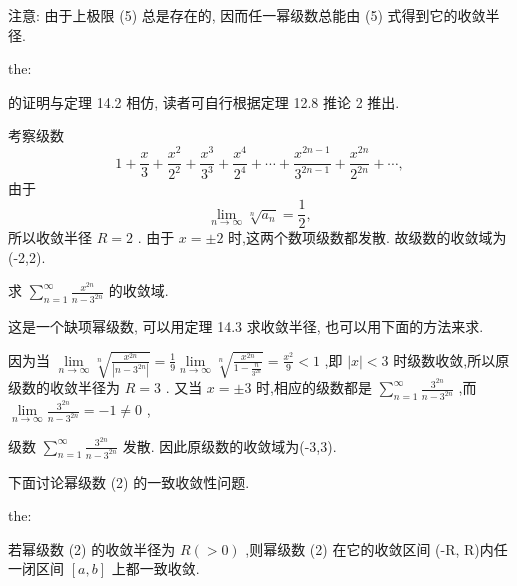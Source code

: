 注意: 由于上极限 (5) 总是存在的, 因而任一幂级数总能由 (5) 式得到它的收敛半径.

\begin{theorem}{}{the:}

\end{theorem}
 的证明与定理 14.2 相仿, 读者可自行根据定理 12.8 推论 2 推出.

\begin{example}

\end{example}
考察级数
\[
1 + \frac{x}{3} + \frac{{x}^{2}}{{2}^{2}} + \frac{{x}^{3}}{{3}^{3}} + \frac{{x}^{4}}{{2}^{4}} + \cdots  + \frac{{x}^{{2n} - 1}}{{3}^{{2n} - 1}} + \frac{{x}^{2n}}{{2}^{2n}} + \cdots ,
\]
由于
\[
\mathop{\lim }\limits_{{n \rightarrow  \infty }}\sqrt[n]{{a}_{n}} = \frac{1}{2},
\]
所以收敛半径 \(R = 2\) . 由于 \(x =  \pm  2\) 时,这两个数项级数都发散. 故级数的收敛域为(-2,2).

\begin{example}

\end{example}
求 \(\mathop{\sum }\limits_{{n = 1}}^{\infty }\frac{{x}^{2n}}{n - {3}^{2n}}\) 的收敛域.

\begin{solution}

\end{solution}
这是一个缺项幂级数, 可以用定理 14.3 求收敛半径, 也可以用下面的方法来求.

因为当 \(\mathop{\lim }\limits_{{n \rightarrow  \infty }}\sqrt[n]{\frac{{x}^{2n}}{\left| n - {3}^{2n}\right| }} = \frac{1}{9}\mathop{\lim }\limits_{{n \rightarrow  \infty }}\sqrt[n]{\frac{{x}^{2n}}{1 - \frac{n}{{3}^{2n}}}} = \frac{{x}^{2}}{9} < 1\) ,即 \(\left| x\right|  < 3\) 时级数收敛,所以原级数的收敛半径为 \(R = 3\) . 又当 \(x =  \pm  3\) 时,相应的级数都是 \(\mathop{\sum }\limits_{{n = 1}}^{\infty }\frac{{3}^{2n}}{n - {3}^{2n}}\) ,而 \(\mathop{\lim }\limits_{{n \rightarrow  \infty }}\frac{{3}^{2n}}{n - {3}^{2n}} =  - 1 \neq  0\) ,

级数 \(\mathop{\sum }\limits_{{n = 1}}^{\infty }\frac{{3}^{2n}}{n - {3}^{2n}}\) 发散. 因此原级数的收敛域为(-3,3).

下面讨论幂级数 (2) 的一致收敛性问题.

\begin{theorem}{}{the:}

\end{theorem}
 若幂级数 (2) 的收敛半径为 \(R\left( { > 0}\right)\) ,则幂级数 (2) 在它的收敛区间 (-R, R)内任一闭区间 \(\left\lbrack  {a,b}\right\rbrack\) 上都一致收敛.


